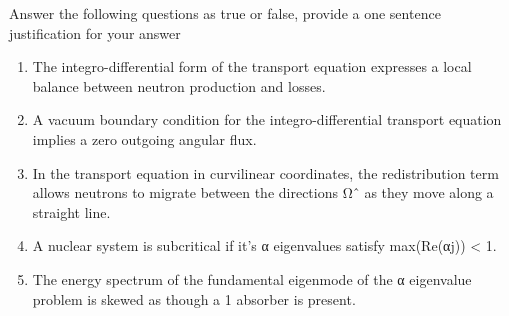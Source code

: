 \documentclass{article}
\begin{document}
Answer the following questions as true or false, provide a one sentence justification for your answer\\
\begin{enumerate}
\item The integro-differential form of the transport equation expresses a local balance between neutron production and losses.
\item A vacuum boundary condition for the integro-differential transport equation implies a zero outgoing angular flux.
\item In the transport equation in curvilinear coordinates, the redistribution term allows neutrons to migrate between the directions Ωˆ as they move along a straight line.
\item A nuclear system is subcritical if it’s α eigenvalues satisfy max(Re(αj)) < 1.
\item The energy spectrum of the fundamental eigenmode of the α eigenvalue problem is skewed as though a 1 absorber is present.
\end{enumerate}
\end{document}
